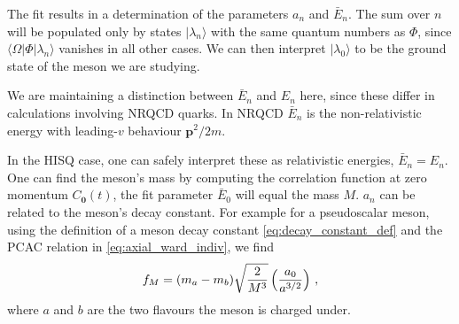 The fit results in a determination of the parameters $a_n$ and $\bar{E}_n$. The sum over $n$ will be populated only by states $|\lambda_n\rangle$ with the same quantum numbers as $\Phi$, since $\langle\Omega | \Phi | \lambda_n \rangle$ vanishes in all other cases. We can then interpret $|\lambda_0\rangle$ to be the ground state of the meson we are studying. 

We are maintaining a distinction between $\bar{E}_n$ and $E_n$ here, since these differ in calculations involving NRQCD quarks. In NRQCD $\bar{E}_n$ is the non-relativistic energy with leading-$v$ behaviour ${\textbf{p}}^2/2m$.

In the HISQ case, one can safely interpret these as relativistic energies, $\bar{E}_n=E_n$. One can find the meson's mass by computing the correlation function at zero momentum $C_{{\textbf{0}}}(t)$, the fit parameter $\bar{E}_0$ will equal the mass $M$. $a_n$ can be related to the meson's decay constant. For example for a pseudoscalar meson, using the definition of a meson decay constant \eqref{eq:decay_constant_def} and the PCAC relation in \eqref{eq:axial_ward_indiv}, we find
\begin{align}
  f_M = (m_a-m_b) \sqrt{2\over M^3} \left({a_0\over a^{3/2}}\right)\,,
  \label{eq:decayconstant_pseudoscalar}
\end{align}
where $a$ and $b$ are the two flavours the meson is charged under.

